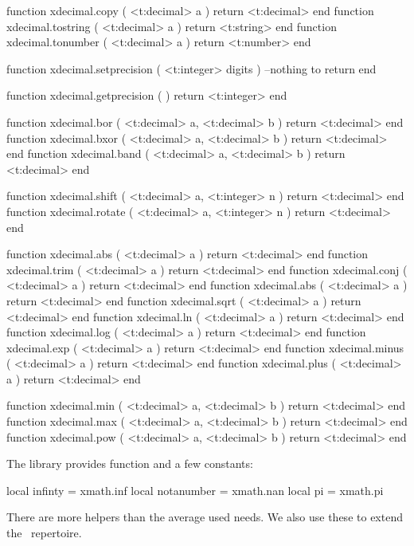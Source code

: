 \starttyping[option=LUA]
function xdecimal.copy     ( <t:decimal> a ) return <t:decimal> end
function xdecimal.tostring ( <t:decimal> a ) return <t:string>  end
function xdecimal.tonumber ( <t:decimal> a ) return <t:number>  end
\stoptyping

\starttyping[option=LUA]
function xdecimal.setprecision ( <t:integer> digits )
    --nothing to return
end

function xdecimal.getprecision ( )
    return <t:integer>
end
\stoptyping

\starttyping[option=LUA]
function xdecimal.bor  ( <t:decimal> a, <t:decimal> b ) return <t:decimal> end
function xdecimal.bxor ( <t:decimal> a, <t:decimal> b ) return <t:decimal> end
function xdecimal.band ( <t:decimal> a, <t:decimal> b ) return <t:decimal> end
\stoptyping

\starttyping[option=LUA]
function xdecimal.shift  ( <t:decimal> a, <t:integer> n ) return <t:decimal> end
function xdecimal.rotate ( <t:decimal> a, <t:integer> n ) return <t:decimal> end
\stoptyping

\starttyping[option=LUA]
function xdecimal.abs   ( <t:decimal> a ) return <t:decimal> end
function xdecimal.trim  ( <t:decimal> a ) return <t:decimal> end
function xdecimal.conj  ( <t:decimal> a ) return <t:decimal> end
function xdecimal.abs   ( <t:decimal> a ) return <t:decimal> end
function xdecimal.sqrt  ( <t:decimal> a ) return <t:decimal> end
function xdecimal.ln    ( <t:decimal> a ) return <t:decimal> end
function xdecimal.log   ( <t:decimal> a ) return <t:decimal> end
function xdecimal.exp   ( <t:decimal> a ) return <t:decimal> end
function xdecimal.minus ( <t:decimal> a ) return <t:decimal> end
function xdecimal.plus  ( <t:decimal> a ) return <t:decimal> end

function xdecimal.min ( <t:decimal> a, <t:decimal> b ) return <t:decimal> end
function xdecimal.max ( <t:decimal> a, <t:decimal> b ) return <t:decimal> end
function xdecimal.pow ( <t:decimal> a, <t:decimal> b ) return <t:decimal> end
\stoptyping

\stopsubsection

\startsubsection[title=Math helpers]

The  library provides function and a few constants:

\starttyping[option=LUA]
local infinty    = xmath.inf
local notanumber = xmath.nan
local pi         = xmath.pi
\stoptyping

There are more helpers than the average used needs. We also use these
to extend the \METAPOST\ repertoire.

